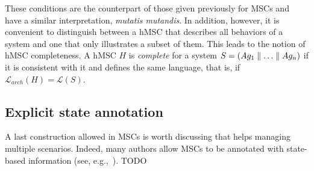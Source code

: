 These conditions are the counterpart of those given previously for MSCs and have a similar interpretation, \emph{mutatis mutandis}. In addition, however, it is convenient to distinguish between a hMSC that describes all behaviors of a system and one that only illustrates a subset of them. This leads to the notion of hMSC completeness. A hMSC $H$ is \emph{complete} for a system $S = (Ag_1 \parallel \ldots \parallel Ag_n)$ if it is consistent with it and defines the same language, that is, if $\mathcal{L}_{arch}(H) = \mathcal{L}(S).$

\subsection{Explicit state annotation}

A last construction allowed in MSCs is worth discussing that helps managing multiple scenarios. Indeed, many authors allow MSCs to be annotated with state-based information (see, e.g.,~\cite{Kruger:2000, Whittle:2000}). TODO
